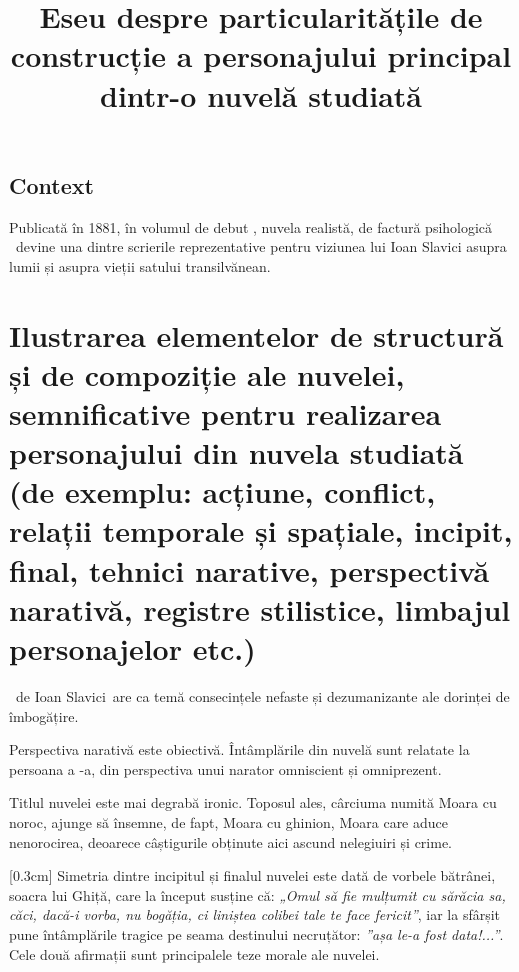 

\newcommand{\operatitle}{\textbfit{„Moara cu noroc”}} %
\newcommand{\operaauthor}{Ioan Slavici} %

\title{Eseu despre particularitățile de construcție a personajului principal dintr-o nuvelă studiată}



\maketitle %



\subsection{Context}

Publicată în 1881, în volumul de debut , nuvela realistă, de factură psihologică \operatitle\ devine una dintre scrierile reprezentative pentru viziunea lui Ioan Slavici asupra lumii și asupra vieții satului transilvănean.


\section{Ilustrarea elementelor de structură și de compoziție ale nuvelei, semnificative pentru realizarea personajului din nuvela studiată {\footnotesize\normalfont (de exemplu: acțiune, conflict, relații temporale și spațiale, incipit, final, tehnici narative, perspectivă narativă, registre stilistice, limbajul personajelor etc.)}}

\operatitle\ de \operaauthor\ are ca temă consecințele nefaste și dezumanizante ale dorinței de îmbogățire.

Perspectiva narativă este obiectivă. Întâmplările din nuvelă sunt relatate la persoana a -a, din perspectiva unui narator omniscient și omniprezent.

Titlul nuvelei este mai degrabă ironic. Toposul ales, cârciuma numită Moara cu noroc, ajunge să însemne, de fapt, Moara cu ghinion, Moara care aduce nenorocirea, deoarece câștigurile obținute aici ascund nelegiuiri și crime.

[0.3cm]
Simetria dintre incipitul și finalul nuvelei este dată de vorbele bătrânei, soacra lui Ghiță, care la început susține că: \textit{„Omul să fie mulțumit cu sărăcia sa, căci, dacă-i vorba, nu bogăția, ci liniștea colibei tale te face fericit”}, iar la sfârșit pune întâmplările tragice pe seama destinului necruțător: \textit{”așa le-a fost data!...”}. Cele două afirmații sunt principalele teze morale ale nuvelei.

